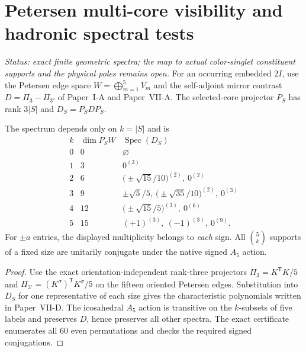 \documentclass[12pt,a4paper]{article}
\begin{document}
\section{Petersen multi-core visibility and hadronic spectral tests}
\label{p11:sec:v323-petersen-hadron-test}
\noindent\textit{Status: exact finite geometric spectra; the map to actual
color-singlet constituent supports and the physical poles remains open.}
For an occurring embedded $2I$, use the Petersen edge space
$W=\bigoplus_{m=1}^5V_m$ and the self-adjoint mirror contrast
$D=\Pi_3-\Pi_{3'}$ of Paper~I-A and Paper~VII-A.  The selected-core
projector $P_S$ has rank $3|S|$ and $D_S=P_SDP_S$.

\begin{theorem}
\label{p11:thm:v323-petersen-k-core-spectrum}
The spectrum depends only on $k=|S|$ and is
\[
\begin{array}{c|c|l}
 k&\dim P_SW&\operatorname{Spec}(D_S)\\\hline
 0&0&\varnothing\\
 1&3&0^{(3)}\\
 2&6&\bigl(\pm\sqrt{15}/10\bigr)^{(2)},\ 0^{(2)}\\
 3&9&\pm\sqrt5/5,\ \bigl(\pm\sqrt{35}/10\bigr)^{(2)},\ 0^{(3)}\\
 4&12&\bigl(\pm\sqrt{15}/5\bigr)^{(3)},\ 0^{(6)}\\
 5&15&(+1)^{(3)},\ (-1)^{(3)},\ 0^{(9)}.
\end{array}
\]
For $\pm a$ entries, the displayed multiplicity belongs to \emph{each}
sign.  All $\binom5k$ supports of a fixed size are unitarily
conjugate under the native signed $A_5$ action.
\end{theorem}
\begin{proof}
Use the exact orientation-independent rank-three projectors
$\Pi_3=K^{\mathsf T}K/5$ and
$\Pi_{3'}=(K^\sigma)^{\mathsf T}K^\sigma/5$ on the fifteen oriented
Petersen edges.  Substitution into $D_S$ for one representative of
each size gives the characteristic polynomials written in
Paper~VII-D.  The icosahedral $A_5$ action is transitive on the
$k$-subsets of five labels and preserves $D$, hence preserves all
other spectra.  The exact certificate enumerates all 60 even
permutations and checks the required signed conjugations.
\end{proof}
\end{document}
